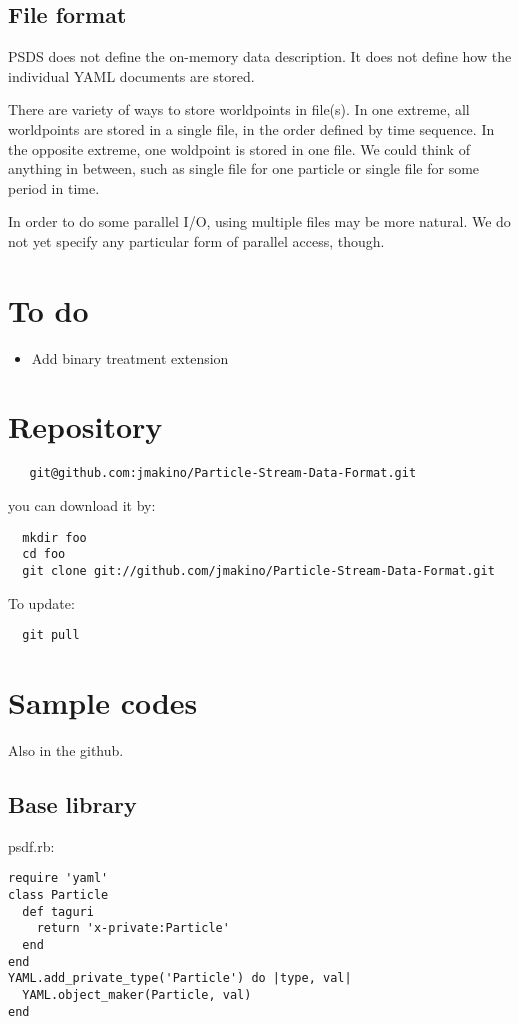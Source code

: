 \documentclass[12pt]{article}
\begin{document}
\subsection{File format}
PSDS does not define the on-memory data description. It does not
define how the individual YAML documents are stored.

There are variety of ways to store worldpoints in file(s). In one
extreme, all worldpoints are stored in a single file, in the order
defined by time sequence. In the opposite extreme, one woldpoint is
stored in one file. We could think of anything in between, such as
single file for one particle or single file for some period in time.

In order to do some parallel I/O, using multiple files may be more
natural. We do not yet specify any particular form of parallel access,
though. 

\section{To do}

\begin{itemize}
\item Add binary treatment extension
\end{itemize}  


\appendix

\section{Repository}


\begin{verbatim}
   git@github.com:jmakino/Particle-Stream-Data-Format.git
\end{verbatim}

you can download it by:
\begin{verbatim}
  mkdir foo
  cd foo
  git clone git://github.com/jmakino/Particle-Stream-Data-Format.git
\end{verbatim}

To update:

\begin{verbatim}
  git pull
\end{verbatim}
  
\section{Sample codes}
Also in the github.

\subsection{Base library}
psdf.rb:
\begin{verbatim}
require 'yaml'
class Particle
  def taguri
    return 'x-private:Particle'
  end
end
YAML.add_private_type('Particle') do |type, val|
  YAML.object_maker(Particle, val)
end
\end{verbatim}
\end{document}
